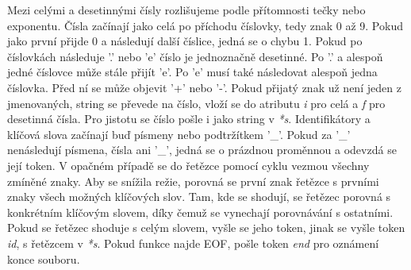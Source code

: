 \documentclass[a4paper, 12pt]{article}
\begin{document}
Mezi celými a desetinnými čísly rozlišujeme podle přítomnosti tečky nebo exponentu. Čísla začínají jako celá po příchodu číslovky, tedy znak 0 až 9. Pokud jako první přijde 0 a následují další číslice, jedná se o chybu 1. Pokud po číslovkách následuje '.' nebo 'e' číslo je jednoznačně desetinné. Po '.' a alespoň jedné číslovce může stále přijít 'e'. Po 'e' musí také následovat alespoň jedna číslovka. Před ní se může objevit '+' nebo '-'. Pokud přijatý znak už není jeden z jmenovaných, string se převede na číslo, vloží se do atributu \textit{i} pro celá a \textit{f} pro desetinná čísla. Pro jistotu se číslo pošle i jako string v \textit{*s}.\newline
Identifikátory a klíčová slova začínají buď písmeny nebo podtržítkem '\_'. Pokud za '\_' nenásledují písmena, čísla ani '\_', jedná se o prázdnou proměnnou a odevzdá se její token. V opačném případě se do řetězce pomocí cyklu vezmou všechny zmíněné znaky. Aby se snížila režie, porovná se první znak řetězce s prvními znaky všech možných klíčových slov. Tam, kde se shodují, se řetězec porovná s konkrétním klíčovým slovem, díky čemuž se vynechají porovnávání s ostatními. Pokud se řetězec shoduje s celým slovem, vyšle se jeho token, jinak se vyšle token \textit{id}, s řetězcem v \textit{*s}.\newline
Pokud funkce najde EOF, pošle token \textit{end} pro oznámení konce souboru.\newline
\end{document}
